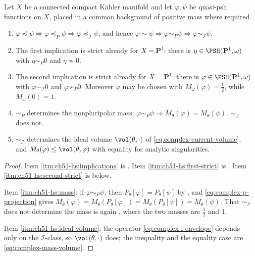 \begin{theorem}
\label{thm:ch51-hierarchy-strict}
Let $X$ be a connected compact K\"ahler manifold and let
$\varphi,\psi$ be quasi-psh functions on $X$, placed in a common
background of positive mass where required.
\begin{enumerate}
\item\label{itm:ch51-hs:implications}
      $\varphi\preceq\psi\Rightarrow\varphi\preceq_P\psi
      \Rightarrow\varphi\preceq_{\mathcal I}\psi$, and hence
      $\varphi\sim\psi\Rightarrow\varphi\sim_P\psi
      \Rightarrow\varphi\sim_{\mathcal I}\psi$.
\item\label{itm:ch51-hs:first-strict}
      The first implication is strict already for $X=\mathbf P^1$:
      there is $\eta\in\PSH(\mathbf P^1,\omega)$ with
      $\eta\sim_P0$ and $\eta\not\sim0$.
\item\label{itm:ch51-hs:second-strict}
      The second implication is strict already for $X=\mathbf P^1$:
      there is $\varphi\in\PSH(\mathbf P^1,\omega)$ with
      $\varphi\sim_{\mathcal I}0$ and $\varphi\not\sim_P0$.
      Moreover $\varphi$ may be chosen with
      $M_\omega(\varphi)=\tfrac12$, while $M_\omega(0)=1$.
\item\label{itm:ch51-hs:mass}
      $\sim_P$ determines the nonpluripolar mass:
      $\varphi\sim_P\psi\Rightarrow M_\theta(\varphi)=M_\theta(\psi)$.
      $\sim_{\mathcal I}$ does not.
\item\label{itm:ch51-hs:ideal-volume}
      $\sim_{\mathcal I}$ determines the ideal volume
      $\vol(\theta,\cdot)$ of
      \eqref{eq:complex-current-volume}, and
      $M_\theta(\varphi)\leq\vol(\theta,\varphi)$ with equality for
      analytic singularities.
\end{enumerate}
\end{theorem}

\begin{proof}
Item \cref{itm:ch51-hs:implications} is
.  Item
\cref{itm:ch51-hs:first-strict} is
.  Item
\cref{itm:ch51-hs:second-strict} is  below.

Item \cref{itm:ch51-hs:mass}: if $\varphi\sim_P\psi$, then
$P_\theta[\varphi]=P_\theta[\psi]$ by
, and
\eqref{eq:complex-p-projection} gives
$M_\theta(\varphi)=M_\theta(P_\theta[\varphi])
=M_\theta(P_\theta[\psi])=M_\theta(\psi)$.  That
$\sim_{\mathcal I}$ does not determine the mass is again
, where the two masses are $\tfrac12$ and $1$.

Item \cref{itm:ch51-hs:ideal-volume}: the operator
\eqref{eq:complex-i-envelope} depends only on the
$\mathcal I$-class, so $\vol(\theta,\cdot)$ does; the inequality and
the equality case are \eqref{eq:complex-mass-volume}.
\end{proof}


